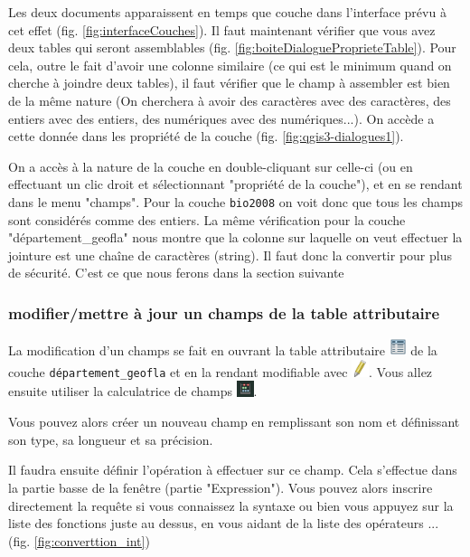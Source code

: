\documentclass[a4paper, 11pt]{article}
\begin{document}
  Les deux documents apparaissent en temps que couche dans l'interface prévu à cet effet (fig. \ref{fig:interfaceCouches}). Il faut maintenant vérifier que vous avez deux tables qui seront assemblables (fig. \ref{fig:boiteDialogueProprieteTable}). Pour cela, outre le fait d'avoir une colonne similaire (ce qui est le minimum quand on cherche à joindre deux tables), il faut vérifier que le champ à assembler est bien de la même nature (On cherchera à avoir des caractères avec des caractères, des entiers avec des entiers, des numériques avec des numériques...). On accède a cette donnée dans les propriété de la couche (fig. \ref{fig:qgis3-dialogues1}).

  On a accès à la nature de la couche en double-cliquant sur celle-ci (ou en effectuant un clic droit et sélectionnant "propriété de la couche"), et en se rendant dans le menu "champs". Pour la couche \texttt{bio2008} on voit donc que tous les champs sont considérés comme des entiers.
  La même vérification pour la couche "département\_geofla" nous montre que la colonne sur laquelle on veut effectuer la jointure est une chaîne de caractères (string). Il faut donc la convertir pour plus de sécurité. C'est ce que nous ferons dans la section suivante

  \subsubsection{modifier/mettre à jour un champs de la table attributaire}

  La modification d'un champs se fait en ouvrant la table attributaire \includegraphics[width=0.5cm]{img/mActionOpenTable} de la couche \texttt{département\_geofla}
et en la rendant modifiable avec \includegraphics[width=0.5cm]{img/mActionToggleEditing}. Vous allez ensuite utiliser la calculatrice de champs \includegraphics[width=0.5cm]{img/calcul_champ}.

  Vous pouvez alors créer un nouveau champ en remplissant son nom et définissant son type, sa longueur et sa précision.

  Il faudra ensuite définir l'opération à effectuer sur ce champ. Cela s'effectue dans la partie basse de la fenêtre (partie "Expression"). Vous pouvez alors inscrire directement la requête si vous connaissez la syntaxe ou bien vous appuyez sur la liste des fonctions juste au dessus, en vous aidant de la liste des opérateurs ... (fig. \ref{fig:converttion_int})
\end{document}
